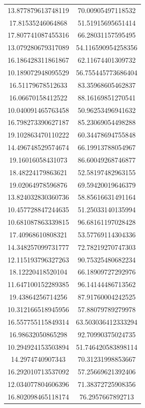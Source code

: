 \begin{table}
\begin{tabular}{cc}
13.877879613748119 & 70.00905497118532 \\
17.81535246064868 & 51.51915695651414 \\
17.807741087455316 & 66.28031157595495 \\
13.079280679317089 & 54.116590954258356 \\
16.186428311861867 & 62.11674401309732 \\
10.189072948095529 & 56.755445773686404 \\
16.51179678512633 & 83.35968605462837 \\
16.06670158412522 & 88.16169851270541 \\
10.040091465763458 & 50.96253496941632 \\
16.798273390627187 & 85.23069054498288 \\
19.102863470110222 & 60.34478694755848 \\
14.496748529574674 & 66.19913788054967 \\
19.16016058431073 & 86.60049268746877 \\
18.48224179863621 & 52.58197482963155 \\
19.02064978596876 & 69.59420019646379 \\
13.824032830360736 & 58.85616631491164 \\
10.457728847244635 & 51.25033140135994 \\
10.681087863339815 & 96.68161197028428 \\
17.40968610808321 & 53.57769114304336 \\
14.348257099731777 & 72.78219270747303 \\
12.115193796327263 & 90.75325480682234 \\
18.12220418520104 & 66.18909727292976 \\
11.647100152289385 & 96.14144486713562 \\
19.43864256714256 & 87.91760004242525 \\
10.312166518945956 & 57.88079789279978 \\
16.557755115849314 & 63.503036412333294 \\
16.98632050865298 & 92.70990375024735 \\
10.294924153503894 & 51.746420583898114 \\
14.2974740907343 & 70.31231998853667 \\
16.292010713537092 & 57.25669621392406 \\
12.034077804606396 & 71.38372725908356 \\
16.802098465118174 & 76.2957667892713 \\

\end{tabular}
\end{table}
